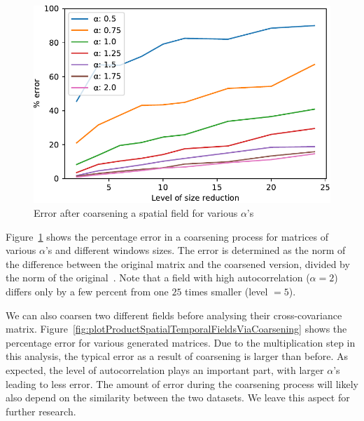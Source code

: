 \documentclass[sigconf]{acmart}
\begin{document}
\begin{figure}[h]
\begin{center}
\includegraphics[width=0.8\columnwidth]{Results/plotSingleSpatialFieldViaCoarsening.pdf}
\caption[Error after coarsening a spatial field]{Error after coarsening a spatial field for various $\alpha$'s}
\label{fig:plotSingleSpatialFieldViaCoarsening}
\end{center}
\end{figure}
Figure~\ref{fig:plotSingleSpatialFieldViaCoarsening} shows the percentage error in a coarsening process for matrices of various $\alpha$'s and different windows sizes. The error is determined as the norm of the difference between the original matrix and the coarsened version, divided by the norm of the original~\cite{Bogaardt2018}. Note that a field with high autocorrelation ($\alpha=2$) differs only by a few percent from one $25$ times smaller (level $= 5$).

We can also coarsen two different fields before analysing their cross-covariance matrix. Figure~\ref{fig:plotProductSpatialTemporalFieldsViaCoarsening} shows the percentage error for various generated matrices. Due to the multiplication step in this analysis, the typical error as a result of coarsening is larger than before. As expected, the level of autocorrelation plays an important part, with larger $\alpha$'s leading to less error. The amount of error during the coarsening process will likely also depend on the similarity between the two datasets. We leave this aspect for further research.
\end{document}

